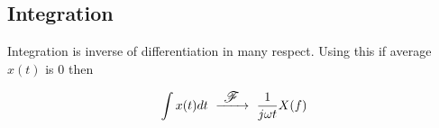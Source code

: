 \newcommand{\FourierTransform}{~ \xrightarrow{ \text{\large $~\mathscr{F}~$}} ~}
\subsection{Integration}
Integration is inverse of differentiation in many respect. Using this if average $x(t)$ is 0 then

\begin{equation}
\int x(t) dt \FourierTransform \frac{1}{j \omega t} X(f)
\end{equation}
